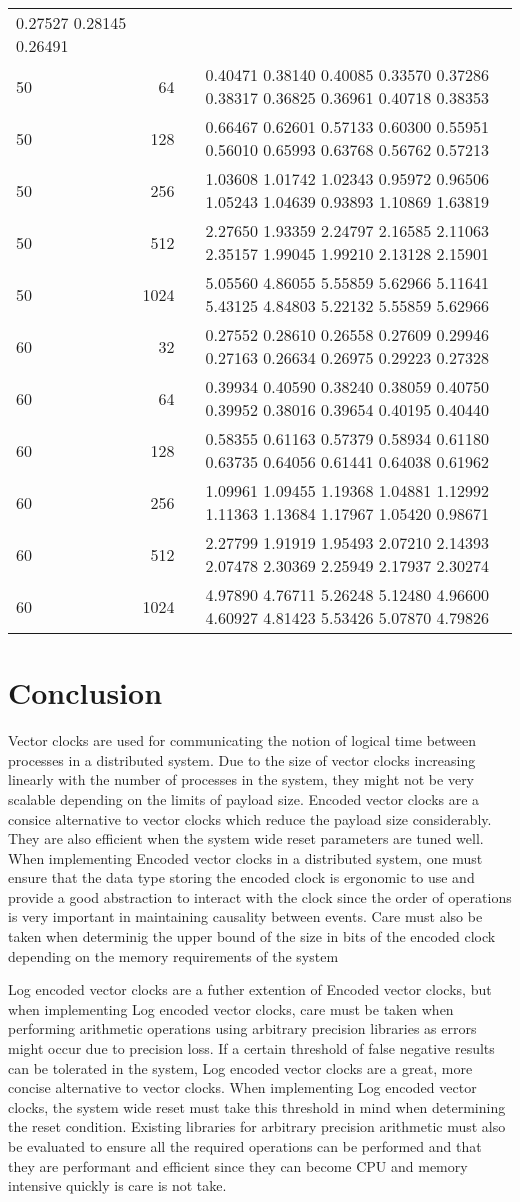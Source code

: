\documentclass[]{article}
\begin{document}
\begin{longtable}[]{@{}lrc@{}}
0.27527 0.28145 0.26491\tabularnewline
50 & 64 & 0.40471 0.38140 0.40085 0.33570 0.37286 0.38317 0.36825
0.36961 0.40718 0.38353\tabularnewline
50 & 128 & 0.66467 0.62601 0.57133 0.60300 0.55951 0.56010 0.65993
0.63768 0.56762 0.57213\tabularnewline
50 & 256 & 1.03608 1.01742 1.02343 0.95972 0.96506 1.05243 1.04639
0.93893 1.10869 1.63819\tabularnewline
50 & 512 & 2.27650 1.93359 2.24797 2.16585 2.11063 2.35157 1.99045
1.99210 2.13128 2.15901\tabularnewline
50 & 1024 & 5.05560 4.86055 5.55859 5.62966 5.11641 5.43125 4.84803
5.22132 5.55859 5.62966\tabularnewline
60 & 32 & 0.27552 0.28610 0.26558 0.27609 0.29946 0.27163 0.26634
0.26975 0.29223 0.27328\tabularnewline
60 & 64 & 0.39934 0.40590 0.38240 0.38059 0.40750 0.39952 0.38016
0.39654 0.40195 0.40440\tabularnewline
60 & 128 & 0.58355 0.61163 0.57379 0.58934 0.61180 0.63735 0.64056
0.61441 0.64038 0.61962\tabularnewline
60 & 256 & 1.09961 1.09455 1.19368 1.04881 1.12992 1.11363 1.13684
1.17967 1.05420 0.98671\tabularnewline
60 & 512 & 2.27799 1.91919 1.95493 2.07210 2.14393 2.07478 2.30369
2.25949 2.17937 2.30274\tabularnewline
60 & 1024 & 4.97890 4.76711 5.26248 5.12480 4.96600 4.60927 4.81423
5.53426 5.07870 4.79826\tabularnewline
\bottomrule
\end{longtable}

\hypertarget{conclusion}{%
\section{Conclusion}\label{conclusion}}

Vector clocks are used for communicating the notion of logical time
between processes in a distributed system. Due to the size of vector
clocks increasing linearly with the number of processes in the system,
they might not be very scalable depending on the limits of payload size.
Encoded vector clocks are a consice alternative to vector clocks which
reduce the payload size considerably. They are also efficient when the
system wide reset parameters are tuned well. When implementing Encoded
vector clocks in a distributed system, one must ensure that the data
type storing the encoded clock is ergonomic to use and provide a good
abstraction to interact with the clock since the order of operations is
very important in maintaining causality between events. Care must also
be taken when determinig the upper bound of the size in bits of the
encoded clock depending on the memory requirements of the system

Log encoded vector clocks are a futher extention of Encoded vector
clocks, but when implementing Log encoded vector clocks, care must be
taken when performing arithmetic operations using arbitrary precision
libraries as errors might occur due to precision loss. If a certain
threshold of false negative results can be tolerated in the system, Log
encoded vector clocks are a great, more concise alternative to vector
clocks. When implementing Log encoded vector clocks, the system wide
reset must take this threshold in mind when determining the reset
condition. Existing libraries for arbitrary precision arithmetic must
also be evaluated to ensure all the required operations can be performed
and that they are performant and efficient since they can become CPU and
memory intensive quickly is care is not take.
\end{document}
